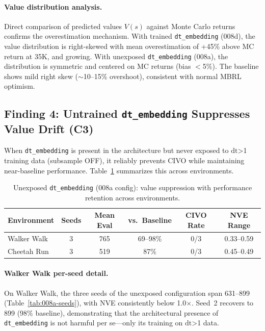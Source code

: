 \documentclass{article}
\newcommand{\dt}{\mathrm{dt}}
\begin{document}
\paragraph{Value distribution analysis.}
Direct comparison of predicted values $V(s)$ against Monte Carlo returns confirms the overestimation mechanism.
With trained \texttt{dt\_embedding} (008d), the value distribution is right-skewed with mean overestimation of +45\% above MC return at 35K, and growing.
With unexposed \texttt{dt\_embedding} (008a), the distribution is symmetric and centered on MC returns (bias $<$5\%).
The baseline shows mild right skew ($\sim$10--15\% overshoot), consistent with normal MBRL optimism.

\subsection{Finding 4: Untrained \texttt{dt\_embedding} Suppresses Value Drift (C3)}

When \texttt{dt\_embedding} is present in the architecture but never exposed to $\dt$>1 training data (subsample OFF), it reliably prevents CIVO while maintaining near-baseline performance.
Table~\ref{tab:unexposed} summarizes this across environments.

\begin{table}[h]
\centering
\caption{Unexposed \texttt{dt\_embedding} (008a config): value suppression with performance retention across environments.}
\label{tab:unexposed}
\begin{tabular}{lccccc}
\toprule
\textbf{Environment} & \textbf{Seeds} & \textbf{Mean Eval} & \textbf{vs.\ Baseline} & \textbf{CIVO Rate} & \textbf{NVE Range} \\
\midrule
Walker Walk & 3 & 765 & 69--98\% & 0/3 & 0.33--0.59 \\
Cheetah Run & 3 & 519 & 87\% & 0/3 & 0.45--0.49 \\
\bottomrule
\end{tabular}
\end{table}

\paragraph{Walker Walk per-seed detail.}
On Walker Walk, the three seeds of the unexposed configuration span 631--899 (Table~\ref{tab:008a-seeds}), with NVE consistently below 1.0$\times$.
Seed~2 recovers to 899 (98\% baseline), demonstrating that the architectural presence of \texttt{dt\_embedding} is not harmful per se---only its training on $\dt$>1 data.
\end{document}
